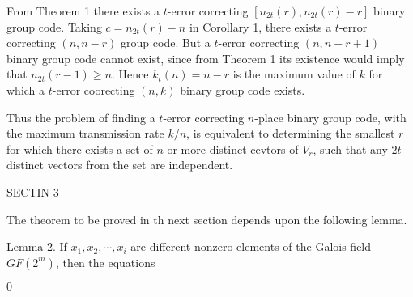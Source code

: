 \documentclass{article}
\begin{document}
From Theorem 1 there exists a $t$-error correcting $[n_{2t}(r),n_{2t}(r)-r]$ binary group code. Taking $c=n_{2t}(r)-n$ in Corollary 1, there exists a $t$-error correcting $(n,n-r)$ group code. But a $t$-error correcting $(n,n-r+1)$ binary group code cannot exist, since from Theorem 1 its existence would imply that $n_{2t}(r-1)\geq n$. Hence $k_t(n)=n-r$ is the maximum value of $k$ for which a $t$-error coorecting $(n,k)$ binary group code exists.

Thus the problem of finding a $t$-error correcting $n$-place binary group code, with the maximum transmission rate $k/n$, is equivalent to determining the smallest $r$ for which there exists a set of $n$ or more distinct cevtors of $V_r$, such that any $2t$ distinct vectors from the set are independent.

SECTIN 3

The theorem to be proved in th next section depends upon the following lemma.

Lemma 2. If $x_1,x_2,\cdots,x_i$ are different nonzero elements of the Galois field $GF(2^m)$, then the equations

$0$
\end{document}
